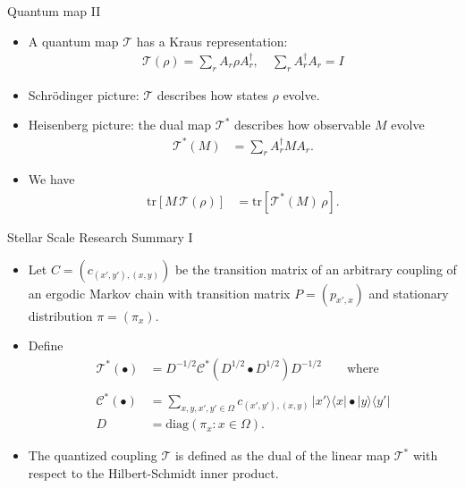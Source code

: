 \documentclass{beamer}
\renewcommand{\>}{\rangle}
\newcommand{\<}{\langle}
\newcommand{\tr}{\mathrm{tr}}
\newcommand{\cC}{\mathcal{C}}
\newcommand{\cT}{\mathcal{T}}
\begin{document}

\begin{frame}{Quantum map II}
\begin{itemize}
    \item A quantum map $\cT$ has a Kraus representation:
    \begin{align*}
        \cT(\rho) = \sum_r A_r \rho A_r^\dagger, \quad \sum_r A_r^\dagger A_r = I
    \end{align*}

    \item Schr\"odinger picture: $\cT$ describes how states $\rho$ evolve.

    \medskip
    \item Heisenberg picture: the dual map $\cT^*$ describes how observable $M$ evolve
    \begin{align*}
        \cT^*(M) 
        &=
        \sum_{r} A_r^\dagger M A_r.
    \end{align*}

    \item We have
    \begin{align*}
        \tr[ M \, \cT(\rho)]
        &=
        \tr[ \cT^*(M) \, \rho].
    \end{align*}
\end{itemize}
\end{frame}

\fi


\begin{frame}{Stellar Scale Research Summary I}
\begin{itemize}

\item Let $C=(c_{(x',y'),(x,y)})$ be the transition matrix of an arbitrary coupling of an ergodic Markov chain with transition matrix $P=(p_{x',x})$ and stationary distribution $\pi=(\pi_x)$.

\bigskip
\item Define
\begin{align*}
    \cT^*(\bullet) 
    &= 
    D^{-1/2} \cC^*( D^{1/2} \bullet D^{1/2} ) D^{-1/2} \quad\quad \mbox{where} \\
    & \\
    \cC^*(\bullet)
    &=
    \sum_{x,y,x',y' \in \Omega} c_{(x',y'),(x,y)} \,
    |x'\>\<x| \bullet |y\>\<y'| \\
    D
    &=
    \mathrm{diag}(\pi_x : x \in \Omega).
\end{align*}

\item The quantized coupling $\cT$ is defined as the dual of the linear map $\cT^*$ with respect to the Hilbert-Schmidt inner product.
\end{itemize}
\end{frame}
\end{document}
